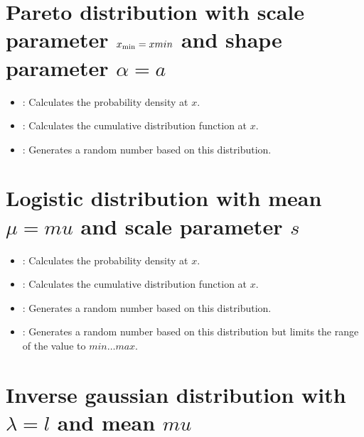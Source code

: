 \section{Pareto distribution with scale parameter \texorpdfstring{$x_{\rm min}=xmin$}{xmin} and shape parameter \texorpdfstring{$\alpha=a$}{a}}

\begin{itemize}

\item
{}:
Calculates the probability density at $x$.

\item
{}:
Calculates the cumulative distribution function at $x$.

\item
{}:
Generates a random number based on this distribution.

\end{itemize}



\section{Logistic distribution with mean \texorpdfstring{$\mu=mu$}{mu} and scale parameter \texorpdfstring{$s$}{s}}

\begin{itemize}

\item
{}:
Calculates the probability density at $x$.

\item
{}:
Calculates the cumulative distribution function at $x$.

\item
{}:
Generates a random number based on this distribution.

\item
{}:
Generates a random number based on this distribution but limits the range of the value to $min\ldots max$.

\end{itemize}


	
\section{Inverse gaussian distribution with \texorpdfstring{$\lambda=l$}{l} and mean \texorpdfstring{$mu$}{mu}}

